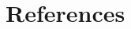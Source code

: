 \documentclass[final,3p,times,authoryear]{elsarticle}
\begin{document}
\section*{References}\label{sec:ref}
   
  


\begin{thebibliography}{00}


\bibitem[ ()]{}

\end{thebibliography}


\appendix
\setcounter{table}{0}
\renewcommand{\thetable}{A\arabic{table}}

\end{document}
